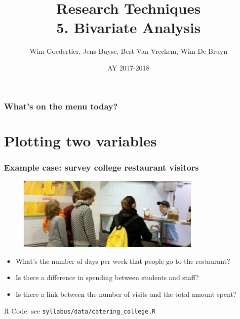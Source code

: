 \documentclass{beamer}
\title[Bivariate Analysis]{Research Techniques\\5. Bivariate Analysis}
\author{Wim Goedertier, Jens Buyse, Bert {Van Vreckem}, Wim {De Bruyn}}
\date{AY 2017-2018}
\begin{document}

\HoGentLogo

\titleframe


\begin{frame}
  \frametitle{What's on the menu today?}

  \tableofcontents
\end{frame}

\section{Plotting two variables}
\sectionframelogo{}

\begin{frame}
  \frametitle{Example case: survey college restaurant visitors}

  \begin{figure}
    \centering
    \includegraphics[width=0.8\textwidth] {img/students.jpg}
    \label{fig:students}
  \end{figure}

  \begin{itemize}
    \item What's the number of days per week that people go to the restaurant?
    \item Is there a difference in spending between students and staff?
    \item Is there a link between the number of visits and the total amount spent?
  \end{itemize}

  R Code: see \texttt{syllabus/data/catering\_college.R}

\end{frame}
\end{document}
